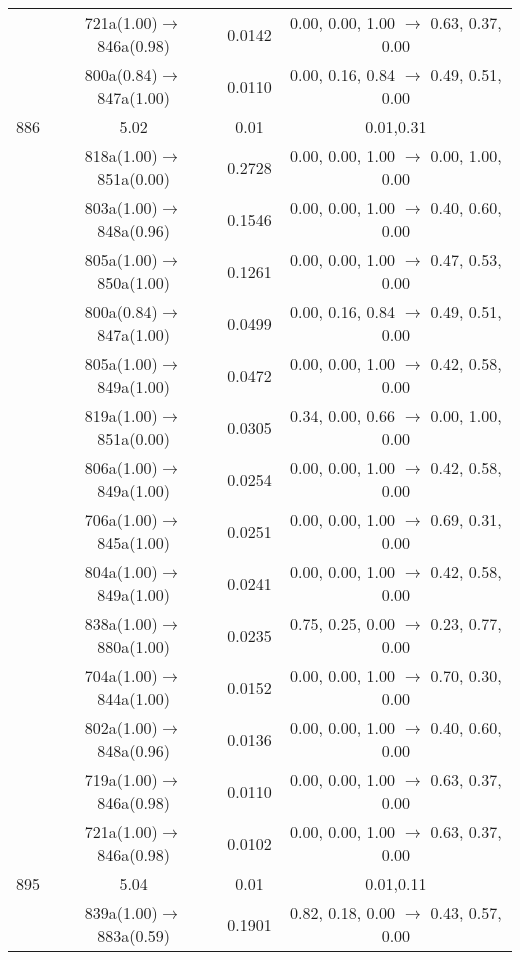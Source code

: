 \documentclass[10pt,a4paper]{article}
\begin{document}
\begin{longtable}{c|c|c|c}
 	& 721a(1.00)$\rightarrow$846a(0.98) &	 0.0142 &	 0.00, 0.00, 1.00 $\rightarrow$ 0.63, 0.37, 0.00 \\ 
 	& 800a(0.84)$\rightarrow$847a(1.00) &	 0.0110 &	 0.00, 0.16, 0.84 $\rightarrow$ 0.49, 0.51, 0.00 \\ 
 \hline886 &	 5.02 &	 0.01 &	 0.01,0.31 \\ 
  	& 818a(1.00)$\rightarrow$851a(0.00) &	 0.2728 &	 0.00, 0.00, 1.00 $\rightarrow$ 0.00, 1.00, 0.00 \\ 
 	& 803a(1.00)$\rightarrow$848a(0.96) &	 0.1546 &	 0.00, 0.00, 1.00 $\rightarrow$ 0.40, 0.60, 0.00 \\ 
 	& 805a(1.00)$\rightarrow$850a(1.00) &	 0.1261 &	 0.00, 0.00, 1.00 $\rightarrow$ 0.47, 0.53, 0.00 \\ 
 	& 800a(0.84)$\rightarrow$847a(1.00) &	 0.0499 &	 0.00, 0.16, 0.84 $\rightarrow$ 0.49, 0.51, 0.00 \\ 
 	& 805a(1.00)$\rightarrow$849a(1.00) &	 0.0472 &	 0.00, 0.00, 1.00 $\rightarrow$ 0.42, 0.58, 0.00 \\ 
 	& 819a(1.00)$\rightarrow$851a(0.00) &	 0.0305 &	 0.34, 0.00, 0.66 $\rightarrow$ 0.00, 1.00, 0.00 \\ 
 	& 806a(1.00)$\rightarrow$849a(1.00) &	 0.0254 &	 0.00, 0.00, 1.00 $\rightarrow$ 0.42, 0.58, 0.00 \\ 
 	& 706a(1.00)$\rightarrow$845a(1.00) &	 0.0251 &	 0.00, 0.00, 1.00 $\rightarrow$ 0.69, 0.31, 0.00 \\ 
 	& 804a(1.00)$\rightarrow$849a(1.00) &	 0.0241 &	 0.00, 0.00, 1.00 $\rightarrow$ 0.42, 0.58, 0.00 \\ 
 	& 838a(1.00)$\rightarrow$880a(1.00) &	 0.0235 &	 0.75, 0.25, 0.00 $\rightarrow$ 0.23, 0.77, 0.00 \\ 
 	& 704a(1.00)$\rightarrow$844a(1.00) &	 0.0152 &	 0.00, 0.00, 1.00 $\rightarrow$ 0.70, 0.30, 0.00 \\ 
 	& 802a(1.00)$\rightarrow$848a(0.96) &	 0.0136 &	 0.00, 0.00, 1.00 $\rightarrow$ 0.40, 0.60, 0.00 \\ 
 	& 719a(1.00)$\rightarrow$846a(0.98) &	 0.0110 &	 0.00, 0.00, 1.00 $\rightarrow$ 0.63, 0.37, 0.00 \\ 
 	& 721a(1.00)$\rightarrow$846a(0.98) &	 0.0102 &	 0.00, 0.00, 1.00 $\rightarrow$ 0.63, 0.37, 0.00 \\ 
 \hline895 &	 5.04 &	 0.01 &	 0.01,0.11 \\ 
  	& 839a(1.00)$\rightarrow$883a(0.59) &	 0.1901 &	 0.82, 0.18, 0.00 $\rightarrow$ 0.43, 0.57, 0.00 \\ 

\end{longtable}
\end{document}
